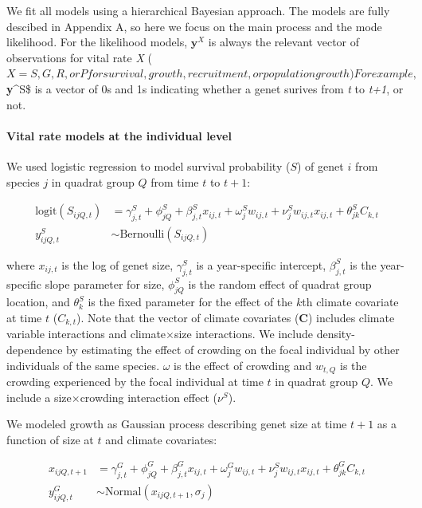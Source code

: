 \documentclass[12pt,]{article}
\begin{document}
We fit all models using a hierarchical Bayesian approach. The models are
fully descibed in Appendix A, so here we focus on the main process and
the mode likelihood. For the likelihood models, $\textbf{y}^X$ is always
the relevant vector of observations for vital rate \emph{X}
($X = S, G, R, or P for survival, growth, recruitment, or population growth) For example, $\textbf{y}\^{}S\$
is a vector of 0s and 1s indicating whether a genet surives from
\emph{t} to \emph{t+1}, or not.

\paragraph{Vital rate models at the individual
level}\label{vital-rate-models-at-the-individual-level}

We used logistic regression to model survival probability ($S$) of genet
$i$ from species $j$ in quadrat group $Q$ from time $t$ to $t+1$:

\begin{align}
\text{logit}(S_{ijQ,t}) &= \gamma^{S}_{j,t} + \phi^{S}_{jQ} + \beta^{S}_{j,t}x_{ij,t} + \omega^{S}_{j}w_{ij,t} + \nu^{S}_{j}w_{ij,t}x_{ij,t} + \theta^{S}_{jk}C_{k,t} \\
y^{S}_{ijQ,t} &\sim \text{Bernoulli}(S_{ijQ,t})
\end{align}

where $x_{ij,t}$ is the log of genet size, $\gamma^{S}_{j,t}$ is a
year-specific intercept, $\beta^{S}_{j,t}$ is the year-specific slope
parameter for size, $\phi^{S}_{jQ}$ is the random effect of quadrat
group location, and $\theta^{S}_{k}$ is the fixed parameter for the
effect of the $k$th climate covariate at time $t$ ($C_{k,t}$). Note that
the vector of climate covariates (\textbf{C}) includes climate variable
interactions and climate$\times$size interactions. We include
density-dependence by estimating the effect of crowding on the focal
individual by other individuals of the same species. $\omega$ is the
effect of crowding and $w_{t,Q}$ is the crowding experienced by the
focal individual at time $t$ in quadrat group $Q$. We include a
size$\times$crowding interaction effect ($\nu^{S}$).

We modeled growth as Gaussian process describing genet size at time
$t+1$ as a function of size at $t$ and climate covariates:

\begin{align}
x_{ijQ,t+1} &= \gamma^{G}_{j,t} + \phi^{G}_{jQ} + \beta^{G}_{j,t}x_{ij,t} + \omega^{G}_{j}w_{ij,t} + \nu^{S}_{j}w_{ij,t}x_{ij,t} + \theta^{G}_{jk}C_{k,t} \\
y^{G}_{ijQ,t} &\sim \text{Normal}(x_{ijQ,t+1}, \sigma_{j})
\end{align}
\end{document}
